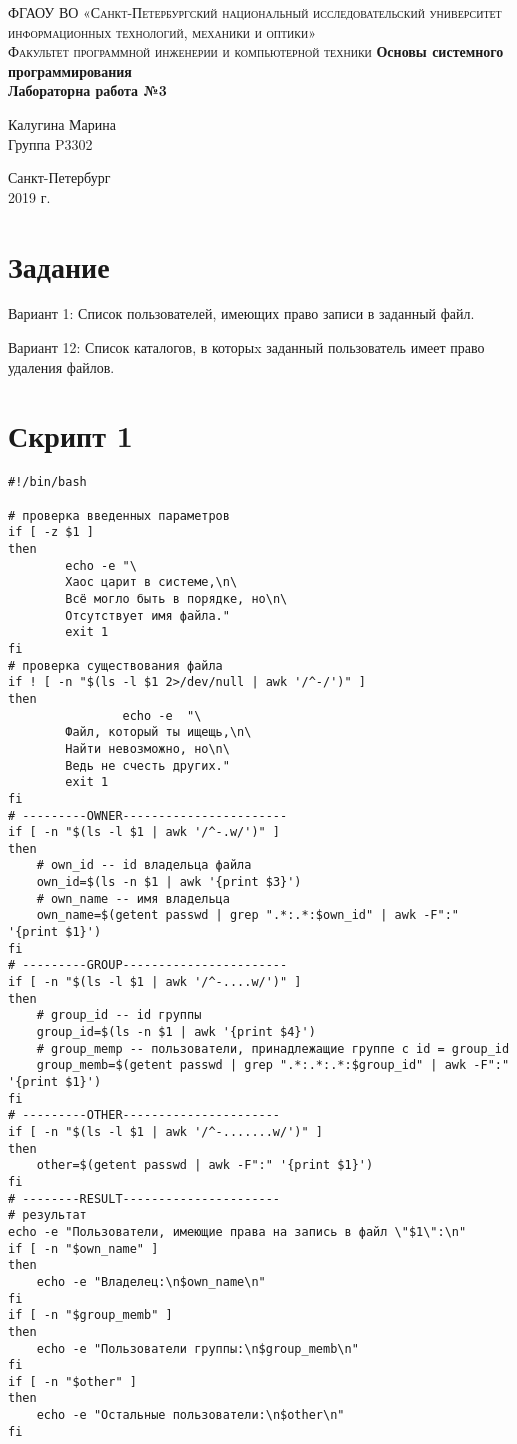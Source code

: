 \documentclass[12pt, a4paper]{article}
\begin{document}
\begin{titlepage}
\begin{center}

\textsc{ФГАОУ ВО «Санкт-Петербургский национальный исследовательский университет информационных технологий, механики и оптики»\\[4mm]
Факультет программной инженерии и компьютерной техники}
\vfill
\textbf{Основы системного программирования\\[4mm]
Лабораторна работа №3\\[25mm]
}
\begin{flushright}
Калугина Марина
\\[2mm]Группа P3302
\end{flushright}
\vfill
Санкт-Петербург\\[2mm]
2019 г.

\end{center}
\end{titlepage}

\section*{Задание}
Вариант 1: Список пользователей, имеющих право записи в заданный файл.

Вариант 12: Список каталогов, в которыx заданный пользователь имеет право удаления файлов.
\section*{Скрипт 1}
\begin{verbatim}
#!/bin/bash

# проверка введенных параметров
if [ -z $1 ]
then
        echo -e "\
        Хаос царит в системе,\n\
        Всё могло быть в порядке, но\n\
        Отсутствует имя файла."
        exit 1
fi
# проверка существования файла
if ! [ -n "$(ls -l $1 2>/dev/null | awk '/^-/')" ] 
then        
				echo -e  "\
        Файл, который ты ищещь,\n\
        Найти невозможно, но\n\
        Ведь не счесть других."
        exit 1
fi
# ---------OWNER-----------------------
if [ -n "$(ls -l $1 | awk '/^-.w/')" ]
then
	# own_id -- id владельца файла
	own_id=$(ls -n $1 | awk '{print $3}')
	# own_name -- имя владельца
	own_name=$(getent passwd | grep ".*:.*:$own_id" | awk -F":" '{print $1}')	
fi
# ---------GROUP-----------------------
if [ -n "$(ls -l $1 | awk '/^-....w/')" ]
then
	# group_id -- id группы
	group_id=$(ls -n $1 | awk '{print $4}')
	# group_memp -- пользователи, принадлежащие группе с id = group_id
	group_memb=$(getent passwd | grep ".*:.*:.*:$group_id" | awk -F":" '{print $1}')
fi
# ---------OTHER----------------------
if [ -n "$(ls -l $1 | awk '/^-.......w/')" ]
then
	other=$(getent passwd | awk -F":" '{print $1}')
fi
# --------RESULT----------------------
# результат
echo -e "Пользователи, имеющие права на запись в файл \"$1\":\n"
if [ -n "$own_name" ] 
then 
	echo -e "Владелец:\n$own_name\n"
fi 
if [ -n "$group_memb" ]
then
	echo -e "Пользователи группы:\n$group_memb\n"
fi
if [ -n "$other" ]
then
	echo -e "Остальные пользователи:\n$other\n"
fi
\end{verbatim}
\end{document}
